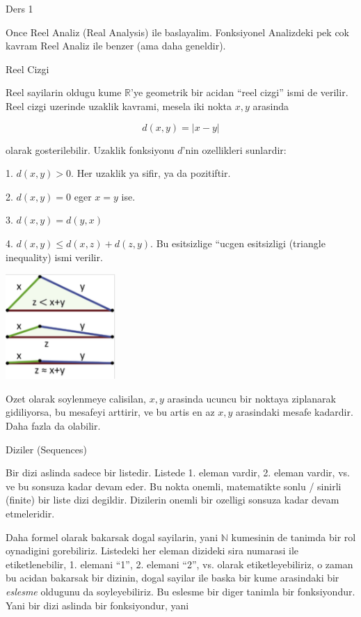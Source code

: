 \documentclass[12pt,fleqn]{article}
\begin{document}
Ders 1 

Once Reel Analiz (Real Analysis) ile baslayalim. Fonksiyonel Analizdeki pek
cok kavram Reel Analiz ile benzer (ama daha geneldir). 

Reel Cizgi 

Reel sayilarin oldugu kume $\mathbb{R}$'ye geometrik bir acidan ``reel
cizgi'' ismi de verilir. Reel cizgi uzerinde uzaklik kavrami, mesela iki
nokta $x,y$ arasinda

\[ d(x,y) = |x - y| \]

olarak gosterilebilir. Uzaklik fonksiyonu $d$'nin ozellikleri sunlardir:

1. $d(x,y) > 0$. Her uzaklik ya sifir, ya da pozitiftir. 

2. $d(x,y) = 0$ eger $x=y$ ise. 

3. $d(x,y) = d(y,x)$

4. $d(x,y) \le d(x,z) + d(z,y)$. Bu esitsizlige ``ucgen esitsizligi
(triangle inequality) ismi verilir. 

\includegraphics[height=4cm]{1_03.png}

Ozet olarak soylenmeye calisilan, $x,y$ arasinda ucuncu bir noktaya
ziplanarak gidiliyorsa, bu mesafeyi arttirir, ve bu artis en az $x,y$
arasindaki mesafe kadardir. Daha fazla da olabilir. 

Diziler (Sequences)

Bir dizi aslinda sadece bir listedir. Listede 1. eleman vardir, 2. eleman
vardir, vs. ve bu sonsuza kadar devam eder. Bu nokta onemli, matematikte
sonlu / sinirli (finite) bir liste dizi degildir. Dizilerin onemli bir
ozelligi sonsuza kadar devam etmeleridir. 

Daha formel olarak bakarsak dogal sayilarin, yani $\mathbb{N}$ kumesinin de
tanimda bir rol oynadigini gorebiliriz. Listedeki her eleman dizideki sira
numarasi ile etiketlenebilir, 1. elemani ``1'', 2. elemani ``2'',
vs. olarak etiketleyebiliriz, o zaman bu acidan bakarsak bir dizinin, dogal
sayilar ile baska bir kume arasindaki bir {\em eslesme} oldugunu da
soyleyebiliriz. Bu eslesme bir diger tanimla bir fonksiyondur. Yani bir
dizi aslinda bir fonksiyondur, yani 
\end{document}
